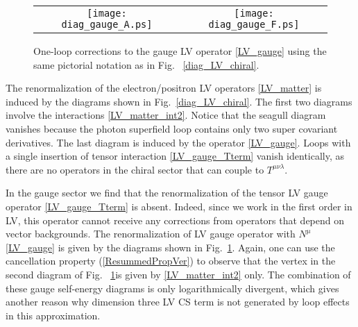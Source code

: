 \documentclass[12pt]{revtex4}
\begin{document}
\begin{figure}
\begin{center}
\begin{tabular}{cc}
\texttt{[image: diag\_gauge\_A.ps]}
&
\texttt{[image: diag\_gauge\_F.ps]}
\end{tabular}
\end{center}
\caption{\label{diag_LV_gauge}
One-loop corrections to the gauge LV operator 
\eqref{LV_gauge} using the same pictorial notation as in Fig.~
\ref{diag_LV_chiral}. 
}
\end{figure}


The renormalization of the electron/positron LV operators
\eqref{LV_matter} is induced by the diagrams shown in 
Fig.~\ref{diag_LV_chiral}. The first two diagrams involve the
interactions \eqref{LV_matter_int2}. Notice that the seagull diagram
vanishes because the photon superfield loop contains only two super
covariant derivatives. The last diagram is induced by the operator  
\eqref{LV_gauge}. Loops with a single insertion of tensor
interaction \eqref{LV_gauge_Tterm} vanish identically, as there are no
operators in the chiral sector that can couple to $T^{\mu\nu\lambda}$. 


In the gauge sector we find that the renormalization of the tensor LV
gauge operator \eqref{LV_gauge_Tterm} is absent. Indeed, since we 
work in the first order in LV, this operator cannot receive any
corrections from operators that depend on vector backgrounds. The
renormalization of LV gauge operator with $N^\mu$ \eqref{LV_gauge} 
is given by the diagrams shown in Fig.~\ref{diag_LV_gauge}. 
Again, one can use the cancellation property (\ref{ResummedPropVer}) 
to observe that the vertex in the second diagram of Fig.~
\ref{diag_LV_gauge}is given by \eqref{LV_matter_int2} only. The
combination of these gauge self-energy diagrams is only
logarithmically divergent, which gives another reason why 
dimension three LV CS term is not generated by loop effects
in this approximation.   
\end{document}
